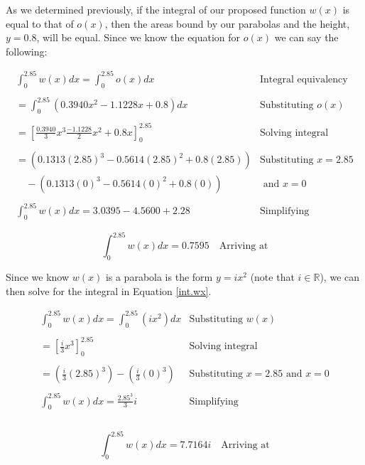 \documentclass[12pt]{article}
\begin{document}
As we determined previously, if the integral of our proposed function $w(x)$ is equal to that of $o(x)$, then the areas bound by our parabolas and the height, $y=0.8$, will be equal. Since we know the equation for $o(x)$ we can say the following:

$$
\begin{array}{l|c}
    \int_0^{2.85}{w(x)}dx = \int_{0}^{2.85}{o(x)}dx & \text{Integral equivalency} \\ \\
    = \int_{0}^{2.85}{(0.3940x^2 -1.1228 x +0.8)}dx & \text{Substituting } o(x) \\ \\
    = \left[   \frac{0.3940}{3}x^3 \frac{-1.1228}{2}x^2 + 0.8x \right]_0^{2.85} & \text{Solving integral} \\ \\
    = (0.1313(2.85)^3 -0.5614(2.85)^2 + 0.8(2.85)) & \text{Substituting } x=2.85 \\ 
    \quad - (0.1313(0)^3 -0.5614(0)^2 + 0.8(0)) & \text{ and } x=0 \\ \\
    \int_0^{2.85}{w(x)}dx = 3.0395 -4.5600 +2.28 & \text{Simplifying}
 \end{array}
$$

\begin{equation}\label{int.wx}
    \boxed{\int_0^{2.85}{w(x)}dx = 0.7595}  \quad \text{Arriving at}
\end{equation}

Since we know $w(x)$ is a parabola is the form $y=ix^2$ (note that $i \in \mathbb{R}$), we can then solve for the integral in Equation \ref{int.wx}.

$$
\begin{array}{l|c}
    \int_0^{2.85}{w(x)}dx = \int_0^{2.85}{(ix^2)}dx & \text{Substituting } w(x) \\ \\
    = \left[   \frac{i}{3}x^3   \right]_0^{2.85} & \text{Solving integral} \\ \\
    = (\frac{i}{3}(2.85)^3) - (\frac{i}{3}(0)^3) & \text{Substituting } x=2.85 \text{ and } x=0 \\ \\
    \int_0^{2.85}{w(x)}dx = \frac{2.85^3}{3}i & \text{Simplifying} \\ \\
 \end{array}
$$

\begin{equation}\label{solve.i}
    \boxed{\int_0^{2.85}{w(x)}dx = 7.7164i}  \quad \text{Arriving at}
\end{equation}
\end{document}
